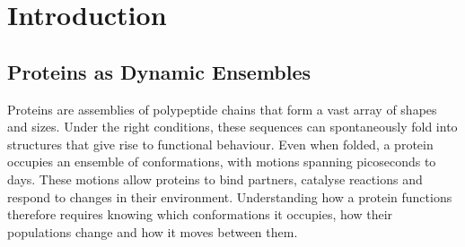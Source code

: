 



\chapter{Introduction}
\label{ch:introduction}

\section{Proteins as Dynamic Ensembles}
\label{sec:intro-ensembles}

Proteins are assemblies of polypeptide chains that form a vast array of shapes and sizes. Under the right conditions, these sequences can spontaneously fold into structures that give rise to functional behaviour. Even when folded, a protein occupies an ensemble of conformations, with motions spanning picoseconds to days.\supercite{parraFrustrationPhysiologyMolecular2025,sapienzaUsingNMRStudy2010} These motions allow proteins to bind partners, catalyse reactions and respond to changes in their environment.\supercite{karplusMolecularDynamicsSimulations2002} Understanding how a protein functions therefore requires knowing which conformations it occupies, how their populations change and how it moves between them.


